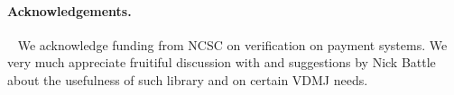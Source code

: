 \documentclass[runningheads,a4paper]{llncs}
\begin{document}
\paragraph*{Acknowledgements.}~
%
We acknowledge funding from NCSC on verification on payment systems. We very much appreciate fruitiful discussion with and suggestions by Nick Battle about the usefulness of such library and on certain VDMJ needs. 


%


\end{document}
